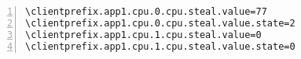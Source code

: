 \documentclass[10pt]{article}
\begin{document}
\begin{Verbatim}[numbers=left,commandchars=\\\{\},numbersep=6pt,fontsize=\small]
\clientprefix.app1.cpu.0.cpu.steal.value=77
\clientprefix.app1.cpu.0.cpu.steal.value.state=2
\clientprefix.app1.cpu.1.cpu.steal.value=0
\clientprefix.app1.cpu.1.cpu.steal.value.state=0
\end{Verbatim}
\end{document}
